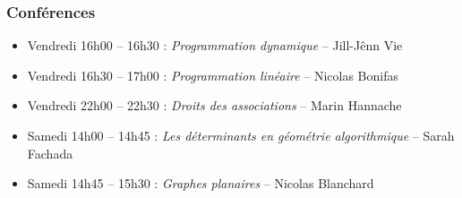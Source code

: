 \documentclass{beamer}
\begin{document}
\begin{frame}
    \frametitle{Conférences}
    \begin{itemize}
        \item Vendredi 16h00 -- 16h30 : \emph{Programmation dynamique}
            -- Jill-Jênn Vie
        \item Vendredi 16h30 -- 17h00 : \emph{Programmation linéaire} --
            Nicolas Bonifas
        \item Vendredi 22h00 -- 22h30 : \emph{Droits des associations} -- Marin
            Hannache
        \item Samedi 14h00 -- 14h45 : \emph{Les déterminants en géométrie
            algorithmique} -- Sarah Fachada
        \item Samedi 14h45 -- 15h30 : \emph{Graphes planaires} -- Nicolas
            Blanchard
    \end{itemize}
\end{frame}
\end{document}
